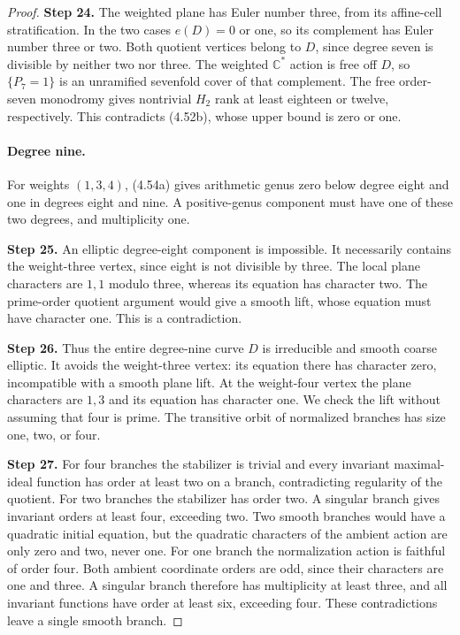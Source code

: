 \begin{proof}
\noindent\textbf{Step 24.} The weighted plane has Euler number three,
from its affine-cell stratification. In the
two cases $e(D)=0$ or one, so its complement
has Euler number three or two. Both quotient
vertices belong to $D$, since degree seven
is divisible by neither two nor three.
The weighted $\mathbb C^*$ action is free
off $D$, so $\{P_7=1\}$ is an unramified
sevenfold cover of that complement. The
free order-seven monodromy gives nontrivial
$H_2$ rank at least eighteen or twelve,
respectively. This contradicts (4.52b),
whose upper bound is zero or one.

\paragraph{Degree nine.}
For weights $(1,3,4)$, (4.54a) gives
arithmetic genus zero below degree eight
and one in degrees eight and nine.
A positive-genus component must have one
of these two degrees, and multiplicity one.

\noindent\textbf{Step 25.} An elliptic degree-eight component is
impossible. It necessarily contains the
weight-three vertex, since eight is not
divisible by three. The local plane
characters are $1,1$ modulo three, whereas
its equation has character two. The
prime-order quotient argument would give
a smooth lift, whose equation must have
character one. This is a contradiction.

\noindent\textbf{Step 26.} Thus the entire degree-nine curve $D$ is
irreducible and smooth coarse elliptic.
It avoids the weight-three vertex: its
equation there has character zero,
incompatible with a smooth plane lift.
At the weight-four vertex the plane
characters are $1,3$ and its equation
has character one. We check the lift
without assuming that four is prime.
The transitive orbit of normalized
branches has size one, two, or four.

\noindent\textbf{Step 27.} For four branches the stabilizer is
trivial and every invariant maximal-ideal
function has order at least two on a
branch, contradicting regularity of the
quotient. For two branches the stabilizer
has order two. A singular branch gives
invariant orders at least four, exceeding
two. Two smooth branches would have a
quadratic initial equation, but the
quadratic characters of the ambient
action are only zero and two, never one.
For one branch the normalization action
is faithful of order four. Both ambient
coordinate orders are odd, since their
characters are one and three. A singular
branch therefore has multiplicity at
least three, and all invariant functions
have order at least six, exceeding four.
These contradictions leave a single
smooth branch.


\end{proof}
